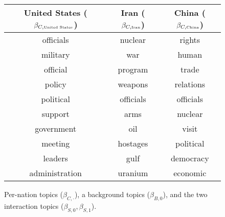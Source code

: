 \begin{figure}
\begin{tabular}{|c|c|c|}
  \textbf{United States ($\beta_{C,\mbox{\tiny United States}}$)} &
  \textbf{Iran ($\beta_{C,\mbox{\tiny Iran}}$)} &
  \textbf{China ($\beta_{C,\mbox{\tiny China}}$)} \\
  \hline
  officials & nuclear & rights \\
  military & war & human \\
  official & program & trade \\
  policy & weapons & relations \\
  political & officials & officials \\
  support & arms & nuclear \\
  government & oil & visit \\
  meeting & hostages & political \\
  leaders & gulf & democracy \\
  administration & uranium & economic \\
  \hline
\end{tabular}
\caption{Per-nation topics ($\beta_{C,\cdot}$), a background topics ($\beta_{B,0}$), and the two interaction topics ($\beta_{S,0}, \beta_{S,1}$).}
\label{fig:fr_unsupervised_topics}
\end{figure}

